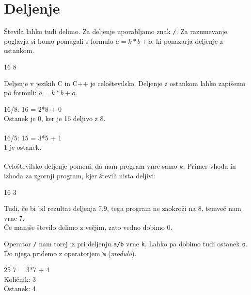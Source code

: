 \documentclass{book}
\begin{document}
\newpage
\section{Deljenje}
Števila lahko tudi delimo. Za deljenje uporabljamo znak \verb+/+.
Za razumevanje poglavja si bomo pomagali s formulo $a = k*b + o$, ki ponazarja deljenje z ostankom.

\begin{examples}


\begin{inout}
16 8
\end{inout}

\end{examples}

\begin{errors}
Deljenje v jezikih C in C++ je celoštevilsko. Deljenje z ostankom lahko zapišemo po formuli: $a = k*b + o$.

16/8: 16 = 2*8 + 0 \\
Ostanek je 0, ker je 16 deljivo z 8. \\\\

16/5: 15 = 3*5 + 1 \\
1 je ostanek. \\\\

Celoštevilsko deljenje pomeni, da nam program vnre samo $k$. Primer vhoda in izhoda za zgornji program, kjer števili nista deljivi:

\begin{inout}
16 3
\end{inout}

Tudi, če bi bil rezultat deljenja 7.9, tega program ne zaokroži na 8, temveč nam vrne 7. \\
Če manjše število delimo z večjim, zato vedno dobimo 0.

\end{errors}

\newpage
Operator \verb+/+ nam torej iz pri deljenju \verb+a/b+ vrne \verb+k+. Lahko pa dobimo tudi ostanek \verb+o+. Do njega pridemo z operatorjem \verb+%+ (\emph{modulo}).

\begin{examples}


\begin{inout}
25 7
 = 3*7 + 4 \\
Količnik: 3 \\
Ostanek: 4
\end{inout}

\end{examples}
\end{document}
